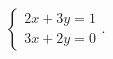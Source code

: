 $\displaystyle
\left\{
\begin{array}{l}
\displaystyle 2x + 3y = 1 \\
\displaystyle 3x + 2y = 0
\end{array}
\right.
$.
